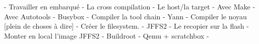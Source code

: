 \documentclass[10pt,ucs,usepdftitle=false]{beamer}
\begin{document}
  - Travailler en embarqué
    - La cross compilation
      - Le host/la target
      - Avec Make
      - Avec Autotools
    - Busybox
    - Compiler la tool chain
      - Yann
    - Compiler le noyau
      [plein de choses à dire]
    - Créer le filesystem. 
      - JFFS2
    - Le recopier sur la flash 
    - Monter en local l'image JFFS2
    - Buildroot
    - Qemu + scratchbox
    - 
\end{document}
